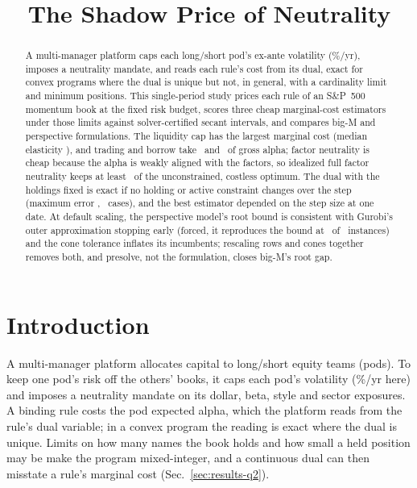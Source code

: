 \documentclass[conference]{IEEEtran}
\begin{document}
\title{The Shadow Price of Neutrality}
\author{}
\maketitle

\begin{abstract}
A multi-manager platform caps each long/short pod's ex-ante volatility (\RiskBudgetPct\%/yr), imposes a neutrality mandate, and reads each rule's cost from its dual, exact for convex programs where the dual is unique but not, in general, with a cardinality limit and minimum positions. This single-period study prices each rule of an S\&P~500 momentum book at the fixed risk budget, scores three cheap marginal-cost estimators under those limits against solver-certified secant intervals, and compares big-M and perspective formulations. The liquidity cap has the largest marginal cost (median elasticity \ELiqMed), and trading and borrow take \SplitTradeMed\ and \SplitBorrowMed\ of gross alpha; factor neutrality is cheap because the alpha is weakly aligned with the factors, so idealized full factor neutrality keeps at least \IdealRetMomMin\ of the unconstrained, costless optimum. The dual with the holdings fixed is exact if no holding or active constraint changes over the step (maximum error \PredOneMax, \PredOneN\ cases), and the best estimator depended on the step size at one date. At default scaling, the perspective model's root bound is consistent with Gurobi's outer approximation stopping early (forced, it reproduces the bound at \NThreeEOneDef\ of \NThreeN\ instances) and the cone tolerance inflates its incumbents; rescaling rows and cones together removes both, and presolve, not the formulation, closes big-M's root gap.
\end{abstract}

\section{Introduction}
\label{sec:intro}
A multi-manager platform allocates capital to long/short equity teams (pods). To keep one pod's risk off the others' books, it caps each pod's volatility (\RiskBudgetPct\%/yr here) and imposes a neutrality mandate on its dollar, beta, style and sector exposures. A binding rule costs the pod expected alpha, which the platform reads from the rule's dual variable; in a convex program the reading is exact where the dual is unique. Limits on how many names the book holds and how small a held position may be make the program mixed-integer, and a continuous dual can then misstate a rule's marginal cost (Sec.~\ref{sec:results-q2}).
\end{document}
